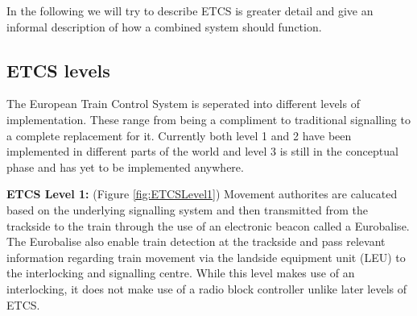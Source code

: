 
In the following we will try to describe ETCS is greater detail and give an informal description of how a combined system should function.


\subsection*{ETCS levels}
The European Train Control System is seperated into different levels of implementation. These range from being a compliment to traditional signalling to a complete replacement for it. Currently both level 1 and 2 have been implemented in different parts of the world and level 3 is still in the conceptual phase and has yet to be implemented anywhere.

\textbf{ETCS Level 1:} (Figure \ref{fig:ETCSLevel1}) Movement authorites are calucated based on the underlying signalling system and then transmitted from the trackside to the train through the use of an electronic beacon called a Eurobalise.  The Eurobalise also enable train detection at the trackside and pass relevant information regarding train movement via the landside equipment unit (LEU) to the interlocking and signalling centre. While this level makes use of an interlocking,  it does not make use of a radio block controller unlike later levels of ETCS.  \\



